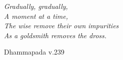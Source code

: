 \cleartorecto
\thispagestyle{empty}

\mbox{}\vfill

\hspace*{5mm}%
\begin{minipage}{\linewidth - 10mm}%
\setlength{\parskip}{5pt}%
\fontsize{10.5}{14.5}\selectfont
\raggedright
\itshape
Gradually, gradually,\\
A moment at a time,\\
The wise remove their own impurities\\
As a goldsmith removes the dross.

\vspace*{\baselineskip}

Dhammapada v.239
\end{minipage}

\vfill\mbox{}
